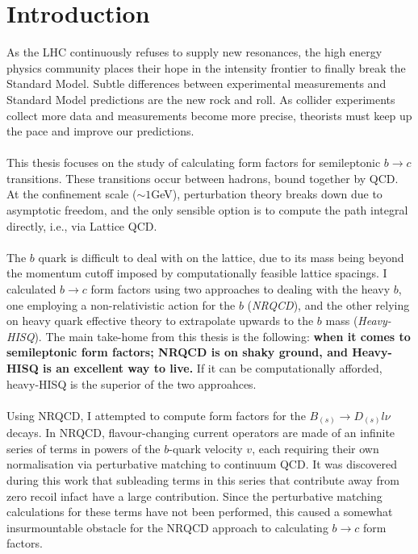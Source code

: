\chapter{Introduction}
\label{sec:intro}

As the LHC continuously refuses to supply new resonances, the high energy physics community places their hope in the intensity frontier to finally break the Standard Model. Subtle differences between experimental measurements and Standard Model predictions are the new rock and roll. As collider experiments collect more data and measurements become more precise, theorists must keep up the pace and improve our predictions.
\\ \\
This thesis focuses on the study of calculating form factors for semileptonic $b\to c$ transitions. These transitions occur between hadrons, bound together by QCD. At the confinement scale ($\sim 1$GeV), perturbation theory breaks down due to asymptotic freedom, and the only sensible option is to compute the path integral directly, i.e., via Lattice QCD.
\\ \\
The $b$ quark is difficult to deal with on the lattice, due to its mass being beyond the momentum cutoff imposed by computationally feasible lattice spacings. I calculated $b\to c$ form factors using two approaches to dealing with the heavy $b$, one employing a non-relativistic action for the $b$ ({\textit{NRQCD}}), and the other relying on heavy quark effective theory to extrapolate upwards to the $b$ mass ({\textit{Heavy-HISQ}}). The main take-home from this thesis is the following: {\textbf{when it comes to semileptonic form factors; NRQCD is on shaky ground, and Heavy-HISQ is an excellent way to live.}} If it can be computationally afforded, heavy-HISQ is the superior of the two approahces.
\\ \\
Using NRQCD, I attempted to compute form factors for the $B_{(s)}\to D_{(s)}l\nu$ decays. %
In NRQCD, flavour-changing current operators are made of an infinite series of terms in powers of the $b$-quark velocity $v$, each requiring their own normalisation via perturbative matching to continuum QCD. It was discovered during this work that subleading terms in this series that contribute away from zero recoil infact have a large contribution. Since the perturbative matching calculations for these terms have not been performed, this caused a somewhat insurmountable obstacle for the NRQCD approach to calculating $b\to c$ form factors.
